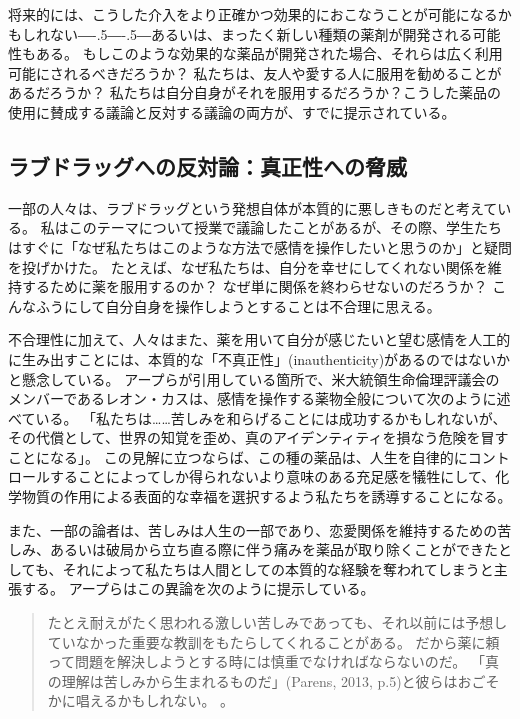 \documentclass[paper=a4,book,openany]{jlreq}
\newcommand{\ig}[1]{}           %
\def\DDASH{―\kern-.5\zw―\kern-.5\zw―} %
\begin{document}
将来的には、こうした介入をより正確かつ効果的におこなうことが可能になるかもしれない{\DDASH}あるいは、まったく新しい種類の薬剤が開発される可能性もある。
もしこのような効果的な薬品が開発された場合、それらは広く利用可能にされるべきだろうか？ 私たちは、友人や愛する人に服用を勧めることがあるだろうか？ 私たちは自分自身がそれを服用するだろうか？こうした薬品の使用に賛成する議論と反対する議論の両方が、すでに提示されている。

\subsection{ラブドラッグへの反対論：真正性への脅威}

一部の人々は、ラブドラッグという発想自体が本質的に悪しきものだと考えている。
私はこのテーマについて授業で議論したことがあるが、その際、学生たちはすぐに「なぜ私たちはこのような方法で感情を操作したいと思うのか」と疑問を投げかけた。
たとえば、なぜ私たちは、自分を幸せにしてくれない関係を維持するために薬を服用するのか？ なぜ単に関係を終わらせないのだろうか？
こんなふうにして自分自身を操作しようとすることは不合理に思える。

不合理性に加えて、人々はまた、薬を用いて自分が感じたいと望む感情を人工的に生み出すことには、本質的な「不真正性」(inauthenticity)があるのではないかと懸念している。
アープらが引用している箇所で、米大統領生命倫理評議会のメンバーであるレオン・カスは、感情を操作する薬物全般について次のように述べている。
「私たちは……苦しみを和らげることには成功するかもしれないが、その代償として、世界の知覚を歪め、真のアイデンティティを損なう危険を冒すことになる」\citep[p.227]{kass03:_beyon_therap}。
この見解に立つならば、この種の薬品は、人生を自律的にコントロールすることによってしか得られないより意味のある充足感を犠牲にして、化学物質の作用による表面的な幸福を選択するよう私たちを誘導することになる。

また、一部の論者は、苦しみは人生の一部であり、恋愛関係を維持するための苦しみ、あるいは破局から立ち直る際に伴う痛みを薬品が取り除くことができたとしても、それによって私たちは人間としての本質的な経験を奪われてしまうと主張する。
アープらはこの異論を次のように提示している。

\begin{quote}
たとえ耐えがたく思われる激しい苦しみであっても、それ以前には予想していなかった重要な教訓をもたらしてくれることがある。
だから薬に頼って問題を解決しようとする時には慎重でなければならないのだ。
「真の理解は苦しみから生まれるものだ」(Parens, 2013, p.5)\ig{Parens}と彼らはおごそかに唱えるかもしれない。
\citep[p.12]{earp13:_if_i_could_just_stop_lovin_you}\nocite{parens13:_good_bad_forms_medic}。
\end{quote}
\end{document}
